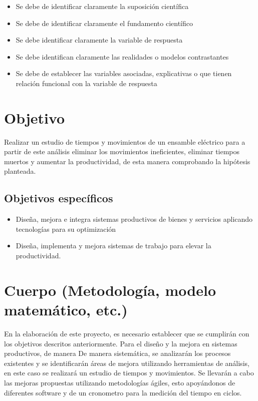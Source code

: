     \begin{itemize}
        \item Se debe de identificar claramente la suposición científica
        \item Se debe de identificar claramente el fundamento científico
        \item Se debe identificar claramente la variable de respuesta
        \item Se debe identifican claramente las realidades o modelos contrastantes
        \item Se debe de establecer las variables asociadas, explicativas o que tienen relación funcional con la variable de respuesta
    \end{itemize}
    \section{Objetivo}
    
    Realizar un estudio de tiempos y movimientos de un ensamble eléctrico para a partir de este análisis eliminar los movimientos ineficientes, eliminar tiempos muertos y aumentar la productividad, de esta manera comprobando la hipótesis planteada.
    
    
    \subsection{Objetivos específicos }
    
    \begin{itemize}
        \item Diseña, mejora e integra sistemas productivos de bienes y servicios aplicando tecnologías para su optimización
        \item Diseña, implementa y mejora sistemas de trabajo para elevar la productividad.
    \end{itemize}
    
    
    \section{Cuerpo (Metodología, modelo matemático, etc.)}
    
    
    
    
    En la elaboración de este proyecto, es necesario establecer que se cumplirán con los objetivos descritos anteriormente. Para el diseño y la mejora en sistemas productivos, de manera De manera sistemática, se analizarán los procesos existentes y se identificarán áreas de mejora utilizando herramientas de análisis, en este caso se realizará un estudio de tiempos y movimientos. Se llevarán a cabo las mejoras propuestas utilizando metodologías ágiles, esto apoyándonos de diferentes software y de un cronometro para la medición del tiempo en ciclos.
    

